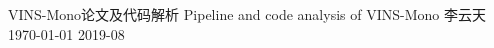 \documentclass[12pt,utf8,twoside]{article} %
\begin{document}
\buecedefinitions%
        {VINS-Mono论文及代码解析}
        {Pipeline and code analysis of VINS-Mono}
        {李云天}
        {\today}
        {2019-08} %

\buecereporttitleboxpage

\buecereporttitlepage

%
\setcounter{page}{1}
%
\tableofcontents\bueceemptypage
\listoffigures\bueceemptypage
\listoftables\bueceemptypage

\buecereportheaders

\setcounter{page}{1}

\appendix
\newpage


\newpage



\end{document}
